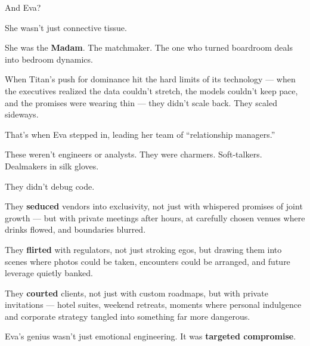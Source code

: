 \medskip

And Eva?

She wasn’t just connective tissue.

She was the \textbf{Madam}.  
The matchmaker.  
The one who turned boardroom deals into bedroom dynamics.

When Titan’s push for dominance hit the hard limits of its technology — when the executives realized the data couldn’t stretch, the models couldn’t keep pace, and the promises were wearing thin — they didn’t scale back.  
They scaled sideways.

That’s when Eva stepped in, leading her team of “relationship managers.”

These weren’t engineers or analysts.  
They were charmers.  
Soft-talkers.  
Dealmakers in silk gloves.

They didn’t debug code.

They \textbf{seduced} vendors into exclusivity, not just with whispered promises of joint growth — but with private meetings after hours, at carefully chosen venues where drinks flowed, and boundaries blurred.

They \textbf{flirted} with regulators, not just stroking egos, but drawing them into scenes where photos could be taken, encounters could be arranged, and future leverage quietly banked.

They \textbf{courted} clients, not just with custom roadmaps, but with private invitations — hotel suites, weekend retreats, moments where personal indulgence and corporate strategy tangled into something far more dangerous.

Eva’s genius wasn’t just emotional engineering.  It was \textbf{targeted compromise}.

\medskip


